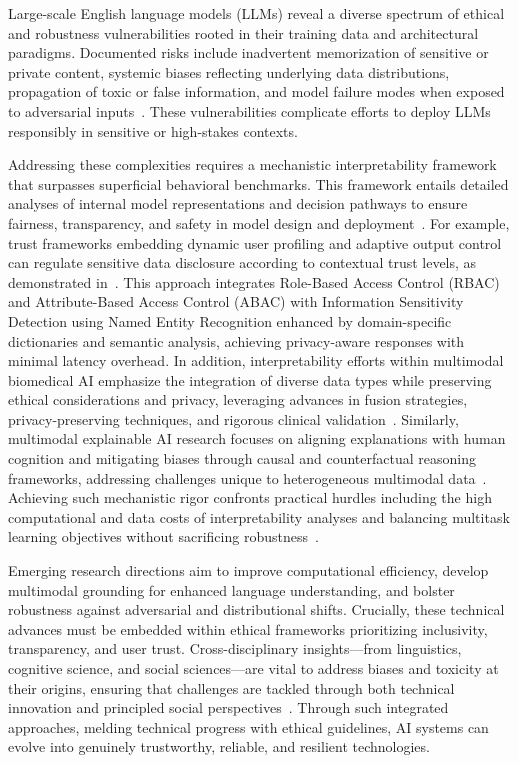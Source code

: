 \documentclass[sigconf]{acmart}
\begin{document}
Large-scale English language models (LLMs) reveal a diverse spectrum of ethical and robustness vulnerabilities rooted in their training data and architectural paradigms. Documented risks include inadvertent memorization of sensitive or private content, systemic biases reflecting underlying data distributions, propagation of toxic or false information, and model failure modes when exposed to adversarial inputs~\cite{ref34}. These vulnerabilities complicate efforts to deploy LLMs responsibly in sensitive or high-stakes contexts.

Addressing these complexities requires a mechanistic interpretability framework that surpasses superficial behavioral benchmarks. This framework entails detailed analyses of internal model representations and decision pathways to ensure fairness, transparency, and safety in model design and deployment~\cite{ref11,ref12,ref13,ref34,ref35}. For example, trust frameworks embedding dynamic user profiling and adaptive output control can regulate sensitive data disclosure according to contextual trust levels, as demonstrated in~\cite{ref11}. This approach integrates Role-Based Access Control (RBAC) and Attribute-Based Access Control (ABAC) with Information Sensitivity Detection using Named Entity Recognition enhanced by domain-specific dictionaries and semantic analysis, achieving privacy-aware responses with minimal latency overhead. In addition, interpretability efforts within multimodal biomedical AI emphasize the integration of diverse data types while preserving ethical considerations and privacy, leveraging advances in fusion strategies, privacy-preserving techniques, and rigorous clinical validation~\cite{ref12}. Similarly, multimodal explainable AI research focuses on aligning explanations with human cognition and mitigating biases through causal and counterfactual reasoning frameworks, addressing challenges unique to heterogeneous multimodal data~\cite{ref13}. Achieving such mechanistic rigor confronts practical hurdles including the high computational and data costs of interpretability analyses and balancing multitask learning objectives without sacrificing robustness~\cite{ref16}.

Emerging research directions aim to improve computational efficiency, develop multimodal grounding for enhanced language understanding, and bolster robustness against adversarial and distributional shifts. Crucially, these technical advances must be embedded within ethical frameworks prioritizing inclusivity, transparency, and user trust. Cross-disciplinary insights—from linguistics, cognitive science, and social sciences—are vital to address biases and toxicity at their origins, ensuring that challenges are tackled through both technical innovation and principled social perspectives~\cite{ref34,ref35}. Through such integrated approaches, melding technical progress with ethical guidelines, AI systems can evolve into genuinely trustworthy, reliable, and resilient technologies.
\end{document}
